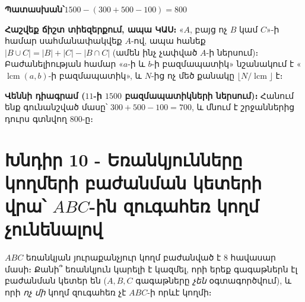 \documentclass[11pt,a4paper]{article}
\newcommand{\answer}[1]{\begin{answerbox}\centering\textbf{Պատասխան՝}\quad #1\end{answerbox}}
\begin{document}
\answer{$1500-(300+500-100)=800$}

\begin{methodbox}
\textbf{Հաշվեք ճիշտ տիեզերքում, ապա ԿԱՍ։} «$A$, բայց ոչ $B$ կամ $C$»-ի համար
սահմանափակվեք $A$-ով, ապա հանեք $|B\cup C|=|B|+|C|-|B\cap C|$ (ամեն ինչ չափված $A$-ի ներսում)։
Բաժանելիության համար «$a$-ի և $b$-ի բազմապատիկ» նշանակում է «$\operatorname{lcm}(a,b)$-ի
բազմապատիկ», և $N$-ից ոչ մեծ քանակը $\lfloor N/\operatorname{lcm}\rfloor$ է։
\end{methodbox}

\medskip
\textbf{Վեննի դիագրամ ($11$-ի $1500$ բազմապատիկների ներսում)։} Հանում ենք գունանշված մասը՝
$300+500-100=700$, և մնում է շրջաններից դուրս գտնվող $800$-ը։

\begin{center}
\end{center}

\section*{Խնդիր 10 - Եռանկյունները կողմերի բաժանման կետերի վրա՝ $ABC$-ին զուգահեռ կողմ չունենալով}

\begin{problembox}[10]
$ABC$ եռանկյան յուրաքանչյուր կողմ բաժանված է $8$ հավասար մասի։ Քանի՞ եռանկյուն կարելի է կազմել,
որի երեք գագաթներն էլ բաժանման կետեր են ($A,B,C$ գագաթները \emph{չեն} օգտագործվում), և որի
\emph{ոչ մի} կողմ զուգահեռ չէ $ABC$-ի որևէ կողմի։
\end{problembox}
\end{document}

